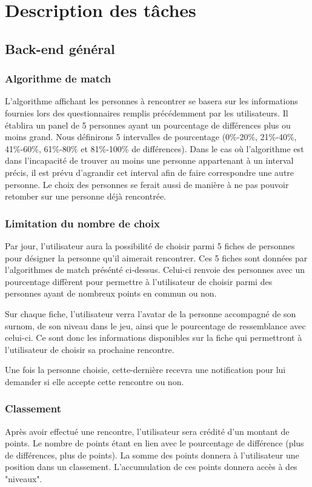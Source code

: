 \documentclass[10pt]{article}
\begin{document}
 \section{Description des tâches}

  \subsection{Back-end général}
   \subsubsection{Algorithme de match}
    L’algorithme affichant les personnes à rencontrer se basera sur les informations fournies lors des questionnaires remplis précédemment
    par les utilisateurs.
    Il établira un panel de 5 personnes ayant un pourcentage de différences plus ou moins grand.
    Nous définirons 5 intervalles de pourcentage (0\%-20\%, 21\%-40\%, 41\%-60\%, 61\%-80\% et 81\%-100\% de différences).
    Dans le cas où l’algorithme est dans l’incapacité de trouver au moins une personne appartenant à un interval précis,
    il est prévu d’agrandir cet interval afin de faire correspondre une autre personne.
    Le choix des personnes se ferait aussi de manière à ne pas pouvoir retomber sur une personne déjà rencontrée.
   \subsubsection{Limitation du nombre de choix}
    Par jour, l'utilisateur aura la possibilité de choisir parmi 5 fiches de personnes pour désigner la personne qu'il aimerait rencontrer.
    Ces 5 fiches sont données par l'algorithmes de match présénté ci-dessus.
    Celui-ci renvoie des personnes avec un pourcentage diffèrent pour permettre à l'utilisateur de choisir parmi des personnes ayant de
    nombreux points en commun ou non.

    Sur chaque fiche, l'utilisateur verra l'avatar de la personne accompagné de son surnom, de son niveau dans le jeu, ainsi que le
    pourcentage de ressemblance avec celui-ci.
    Ce sont donc les informations disponibles sur la fiche qui permettront à l'utilisateur de choisir sa prochaine rencontre.

    Une fois la personne choisie, cette-dernière recevra une notification pour lui demander si elle accepte cette rencontre ou non.
   \subsubsection{Classement}
    Après avoir effectué une rencontre, l'utilisateur sera crédité d'un montant de points. Le nombre de points étant en lien avec le
    pourcentage de différence (plus de différences, plus de points). La somme des points donnera à l'utilisateur une position dans
    un classement. L'accumulation de ces points donnera accès à des "niveaux".
\end{document}
